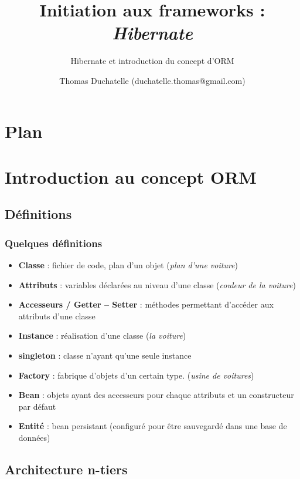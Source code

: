 \documentclass[compact]{beamer}%
\title{Initiation aux frameworks : \emph{Hibernate}}
\subtitle{Hibernate et introduction du concept d'ORM}
\author{Thomas Duchatelle (duchatelle.thomas@gmail.com)}
\institute{Capgemini, pour Yves Rocher}
\begin{document}
\frame{\titlepage}
  
\section*{Plan}
\frame{\tableofcontents[hideallsubsections]}
	
\section{Introduction au concept ORM}
	
\subsection{Définitions}
		
\begin{frame}
	\frametitle{Quelques définitions}
	\begin{itemize}[<+->]
	\item \textbf{Classe} : fichier de code, plan d'un objet (\emph{plan d'une voiture})
	\item \textbf{Attributs} : variables déclarées au niveau d'une classe (\emph{couleur de la voiture})
	\item \textbf{Accesseurs / Getter -- Setter} : méthodes permettant d'accéder aux attributs d'une classe
	\item \textbf{Instance} : réalisation d'une classe (\emph{la voiture})
	\item \textbf{singleton} : classe n'ayant qu'une seule instance
	\item \textbf{Factory} : fabrique d'objets d'un certain type. (\emph{usine de voitures}) %
	\item \textbf{Bean} : objets ayant des accesseurs pour chaque attributs et un constructeur par défaut
	\item \textbf{Entité} : bean persistant (configuré pour être sauvegardé dans une base de données)
	\end{itemize}
\end{frame}
	
\subsection{Architecture n-tiers}
\end{document}
